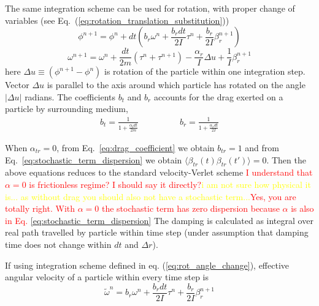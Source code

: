 The same integration scheme can be used for rotation, with proper change of variables (see Eq.~(\ref{eq:rotation_translation_substitution}))
\begin{equation}
\label{eq:rot_angle_change}
	\phi^{n+1} = \phi^n + dt \left(
	  b_{r} \omega^n
	  + \frac{b_{r} dt}{2I}\tau^n
	  + \frac{b_{r} }{2I}\beta_{r}^{n+1}
	 \right)
\end{equation}
\begin{equation}
\label{eq:rot_ang_velocity_change}
	\omega^{n+1} = \omega^n
	+ \frac{dt}{2m}\left(\tau^n + \tau^{n+1}\right)
	- \frac{\alpha_{r}}{I}\Delta u
	+ \frac{1}{I}\beta_{r}^{n+1}
\end{equation}
here $\Delta u \equiv \left(\phi^{n+1} - \phi^n\right)$ is rotation of the particle within one integration step. Vector $\Delta u$ is parallel to the axis around which particle has rotated on the angle $|\Delta u|$ radians. The coefficients $b_t$ and $b_r$ accounts for the drag exerted on a particle by surrounding medium,
\begin{equation}
\label{eq:drag_coefficient}
	\begin{aligned}
		b_t = \frac{1}{1 + \frac{\alpha_t dt}{2 m}}
	\end{aligned}
	\qquad
	\qquad
	\begin{aligned}
		b_r = \frac{1}{1 + \frac{\alpha_r dt}{2 I}}
	\end{aligned}
\end{equation}

When $\alpha_{tr} = 0$, from Eq.~\eqref{eq:drag_coefficient} we obtain $b_{tr} = 1$ and from Eq.~\eqref{eq:stochastic_term_dispersion} we obtain $\langle\beta_{tr}(t)\beta_{tr}(t')\rangle = 0$. Then the above equations reduces to the standard velocity-Verlet scheme \textcolor{red}{I understand that $\alpha = 0$ is frictionless regime? I should say it directly?}\textcolor{yellow}{i am not sure how physical it is... as without drag you should also not have a stochastic term...}\textcolor{red}{Yes, you are totally right. With $\alpha = 0$ the stochastic term has zero dispersion because $\alpha$ is also in Eq. \ref{eq:stochastic_term_dispersion}} The damping is calculated as integral  over real path travelled by particle within time step (under assumption that damping time does not change within $dt$ and $\Delta r$).

If using integration scheme defined in eq. (\ref{eq:rot_angle_change}), effective angular velocity of a particle within every time step is
\begin{equation}
\label{eq:effective_angular_velocity}
	\tilde{\omega}^n = b_{r} \omega^n
	+ \frac{b_{r} dt}{2I}\tau^n
	+ \frac{b_{r} }{2I}\beta_{r}^{n+1}
\end{equation}

